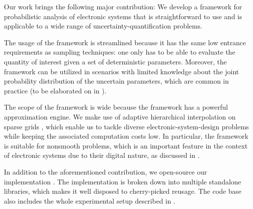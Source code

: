 Our work brings the following major contribution: We develop a framework for
probabilistic analysis of electronic systems that is straightforward to use and
is applicable to a wide range of uncertainty-quantification problems.

The usage of the framework is streamlined because it has the same low entrance
requirements as sampling techniques: one only has to be able to evaluate the
quantity of interest given a set of deterministic parameters. Moreover, the
framework can be utilized in scenarios with limited knowledge about the joint
probability distribution of the uncertain parameters, which are common in
practice (to be elaborated on in ).

The scope of the framework is wide because the framework has a powerful
approximation engine. We make use of adaptive hierarchical interpolation on
sparse grids \cite{jakeman2012, klimke2006, ma2009}, which enable us to tackle
diverse electronic-system-design problems while keeping the associated
computation costs low. In particular, the framework is suitable for nonsmooth
problems, which is an important feature in the context of electronic systems due
to their digital nature, as discussed in .

In addition to the aforementioned contribution, we open-source our
implementation \cite{sources}. The implementation is broken down into multiple
standalone libraries, which makes it well disposed to cherry-picked reusage. The
code base also includes the whole experimental setup described in
.
